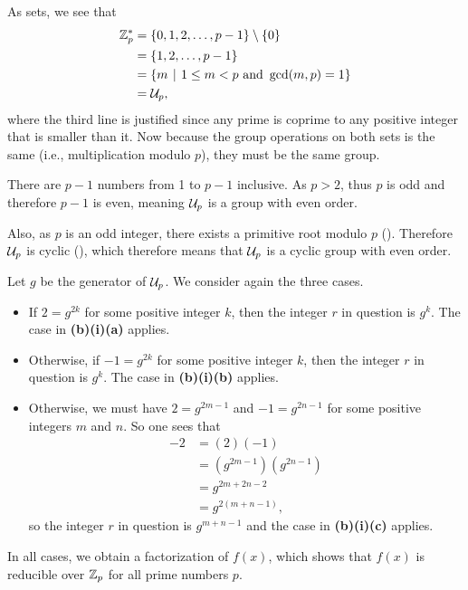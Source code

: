 \begin{questions}
\begin{partquestions}{\alph*}
\begin{partquestions}{\roman*}
            \item As sets, we see that
            \begin{align*}
                \Z_p^\ast &= \{0, 1, 2, \dots, p-1\} \setminus \{0\}\\
                &= \{1, 2, \dots, p-1\}\\
                &= \left\{m \vert 1 \leq m < p \text{ and } \gcd(m,p) = 1\right\}\\
                &= \Un{p},
            \end{align*}
            where the third line is justified since any prime is coprime to any positive integer that is smaller than it. Now because the group operations on both sets is the same (i.e., multiplication modulo $p$), they must be the same group.

            \item There are $p - 1$ numbers from 1 to $p - 1$ inclusive. As $p > 2$, thus $p$ is odd and therefore $p - 1$ is even, meaning $\mathcal{U}_{p}$ is a group with even order.

            Also, as $p$ is an odd integer, there exists a primitive root modulo $p$ (). Therefore $\mathcal{U}_{p}$ is cyclic (), which therefore means that $\mathcal{U}_{p}$ is a cyclic group with even order.

            \item Let $g$ be the generator of $\mathcal{U}_{p}$. We consider again the three cases.
            \begin{itemize}
                \item If $2 = g^{2k}$ for some positive integer $k$, then the integer $r$ in question is $g^k$. The case in \textbf{(b)(i)(a)} applies.
                \item Otherwise, if $-1 = g^{2k}$ for some positive integer $k$, then the integer $r$ in question is $g^k$. The case in \textbf{(b)(i)(b)} applies.
                \item Otherwise, we must have $2 = g^{2m - 1}$ and $-1 = g^{2n - 1}$ for some positive integers $m$ and $n$. So one sees that
                \begin{align*}
                    -2 &= (2)(-1)\\
                    &= \left(g^{2m-1}\right)\left(g^{2n-1}\right)\\
                    &= g^{2m+2n-2}\\
                    &= g^{2(m+n-1)},
                \end{align*}
                so the integer $r$ in question is $g^{m+n-1}$ and the case in \textbf{(b)(i)(c)} applies.
            \end{itemize}
            In all cases, we obtain a factorization of $f(x)$, which shows that $f(x)$ is reducible over $\mathbb{Z}_p$ for all prime numbers $p$.
        \end{partquestions}
    \end{partquestions}
\end{questions}
